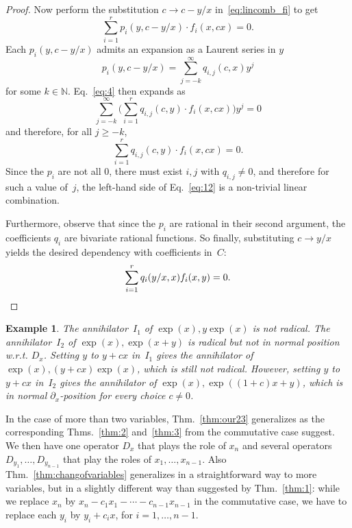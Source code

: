 \documentclass[a4paper,draft]{amsart}
\let\set\mathbb
\newtheorem{ex}[thm]{Example}
\begin{document}
\begin{proof}
  Now perform the substitution $c\to c-y/x$ in~\eqref{eq:lincomb_fi} to get
  \begin{equation}
    \label{eq:4}
    \sum_{i=1}^r p_i(y,c-y/x)\cdot f_i(x,cx) = 0.
  \end{equation}
  Each $p_{i}(y, c-y/x)$ admits an expansion as a Laurent series in $y$
  \begin{equation}
    \label{eq:2}
    p_{i}(y, c-y/x) = \sum_{j=-k}^{\infty}q_{i,j}(c,x)y^{j}
  \end{equation}
  for some $k\in\set N$.
  Eq.~\eqref{eq:4} then expands as
  \begin{equation}
    \label{eq:10}
    \sum_{j=-k}^{\infty}\big(\sum_{i=1}^r q_{i,j}(c,y)\cdot f_i(x,cx)\big) y^{j} = 0
  \end{equation}
  and therefore, for all $j \geq -k$,
  \begin{equation}
    \label{eq:12}
    \sum_{i=1}^r q_{i,j}(c,y)\cdot f_i(x,cx) = 0.
  \end{equation}
  Since the $p_{i}$ are not all $0$, there must exist $i,j$ with $q_{i,j}\neq 0$,
  and therefore for such a value of~$j$, the left-hand side of Eq.~\eqref{eq:12} is
  a non-trivial linear combination.
  
  Furthermore, observe that since the $p_i$ are rational in their second
  argument, the coefficients $q_i$ are bivariate
  rational functions.
  So finally, substituting $c\to y/x$ yields the desired dependency with coefficients in~$C$:
  \[
    \sum_{i=1}^r q_i(y/x,x) f_i(x,y) = 0.\qedhere
  \]
\end{proof}

\begin{ex}
  The annihilator~$I_1$ of $\exp(x),y\exp(x)$ is not radical. The annihilator~$I_2$
  of $\exp(x),\exp(x+y)$ is radical but not in normal position w.r.t. $D_x$.
  Setting $y$ to $y+cx$ in~$I_1$ gives the annihilator of $\exp(x),(y+cx)\exp(x)$,
  which is still not radical. However, setting $y$ to $y+cx$ in~$I_2$ gives
  the annihilator of $\exp(x),\exp((1+c)x+y)$, which is in normal
  $\partial_x$-position for every choice $c\neq0$.
\end{ex}

In the case of more than two variables, Thm.~\ref{thm:our23} generalizes as
the corresponding Thms.~\ref{thm:2} and~\ref{thm:3} from the commutative case
suggest. We then have one operator $D_x$ that plays the role of $x_n$ and
several operators $D_{y_1},\dots,D_{y_{n-1}}$ that play the roles of $x_1,\dots,x_{n-1}$.
Also Thm.~\ref{thm:changofvariables} generalizes in a straightforward way to
more variables, but in a slightly different way than suggested by Thm.~\ref{thm:1}:
while we replace $x_n$ by $x_n-c_1x_1-\cdots-c_{n-1}x_{n-1}$ in the commutative
case, we have to replace each $y_i$ by $y_i+c_ix$, for $i=1,\dots,n-1$. 



\end{document}
